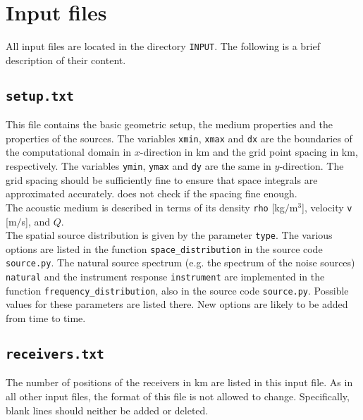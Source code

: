 \chapter{Input files}


All input files are located in the directory \texttt{INPUT}. The following is a brief description of their content.

\section{\texttt{setup.txt}}

This file contains the basic geometric setup, the medium properties and the properties of the sources. The variables \texttt{xmin}, \texttt{xmax} and \texttt{dx} are the boundaries of the computational domain in $x$-direction in km and the grid point spacing  in km, respectively.  The variables \texttt{ymin}, \texttt{ymax} and \texttt{dy} are the same in $y$-direction. The grid spacing should be sufficiently fine to ensure that space integrals are approximated accurately. \GI does not check if the spacing fine enough.\\[5pt]
%
The acoustic medium is described in terms of its density \texttt{rho} [kg$/$m$^3$], velocity \texttt{v} [m$/$s], and $Q$.\\[5pt]
%
The spatial source distribution is given by the parameter \texttt{type}. The various options are listed in the function \texttt{space\_distribution} in the source code \texttt{source.py}. The natural source spectrum (e.g. the spectrum of the noise sources) \texttt{natural} and the instrument response \texttt{instrument} are implemented in the function \texttt{frequency\_distribution}, also in the source code \texttt{source.py}. Possible values for these parameters are listed there. New options are likely to be added from time to time.

\section{\texttt{receivers.txt}}

The number of positions of the receivers in km are listed in this input file. As in all other input files, the format of this file is not allowed to change. Specifically, blank lines should neither be added or deleted.

